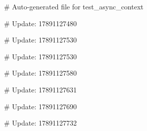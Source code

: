 # Auto-generated file for test_async_context

# Update: 17891127480

# Update: 17891127530

# Update: 17891127530

# Update: 17891127580

# Update: 17891127631

# Update: 17891127690

# Update: 17891127732
